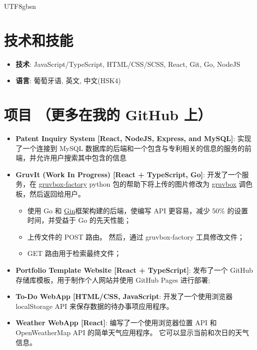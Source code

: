 \documentclass[a4paper, 20pt]{article}
\newcommand{\resumeItem}[2]{
  \item\small{
    \textbf{#1}{: #2 \vspace{-2pt}}
  }
}
\newcommand{\resumeSubItem}[2]{\resumeItem{#1}{#2}\vspace{-3pt}}
\newcommand{\resumeSubHeadingListStart}{\begin{itemize}[leftmargin=*]}
\newcommand{\resumeSubHeadingListEnd}{\end{itemize}}
\begin{document}
\begin{CJK*}{UTF8}{gbsn}
\vspace{5pt}
\section{\textcolor[HTML]{E36C09}{\textbf{技术和技能}}}
	\resumeSubHeadingListStart
	  \resumeSubItem{技术}{\quad JavaScript/TypeScript, HTML/CSS/SCSS, React, Git, Go, NodeJS}
	  \resumeSubItem{语言}{\quad 葡萄牙语, 英文, 中文(HSK4)}
  \resumeSubHeadingListEnd


\vspace{5pt}
\section{\textcolor[HTML]{E36C09}{\textbf{项目}} \tiny{（更多在我的 GitHub 上）}}
  \resumeSubHeadingListStart
    \resumeSubItem{Patent Inquiry System [React, NodeJS, Express, and MySQL]}
      {实现了一个连接到 MySQL 数据库的后端和一个包含与专利相关的信息的服务的前端，并允许用户搜索其中包含的信息}
      \vspace{2pt}
      \resumeSubItem{GruvIt (Work In Progress) [React + TypeScript, Go]}
      {开发了一个服务，在 \href{https://github.com/paulopacitti/gruvbox-factory}{gruvbox-factory} python 包的帮助下将上传的图片修改为 \href{https://github.com/morhetz/gruvbox}{gruvbox} 调色板，然后返回给用户。}
      \begin{itemize}
        \item{使用 Go 和 \href{https://github.com/gin-gonic/gin}{Gin}框架构建的后端，使编写 API 更容易，减少 50\% 的设置时间，并受益于 Go 的先天性能；}
        \item{上传文件的 POST 路由。 然后，通过 gruvbox-factory 工具修改文件；}
        \item{GET 路由用于检索最终文件；}
      \end{itemize}
      \vspace{2pt}
    \resumeSubItem{Portfolio Template Website [React + TypeScript]}
      {发布了一个 GitHub 存储库模板，用于制作个人网站并使用 GitHub Pages 进行部署;}
      \vspace{2pt}
    \resumeSubItem{To-Do WebApp [HTML/CSS, JavaScript}
      {开发了一个使用浏览器 localStorage API 来保存数据的待办事项应用程序。}
      \vspace{2pt}
    \resumeSubItem{Weather WebApp [React]}
      {编写了一个使用浏览器位置 API 和 OpenWeatherMap API 的简单天气应用程序。 它可以显示当前和次日的天气信息。}
      \vspace{2pt}
  \resumeSubHeadingListEnd

\clearpage\end{CJK*}
\end{document}
